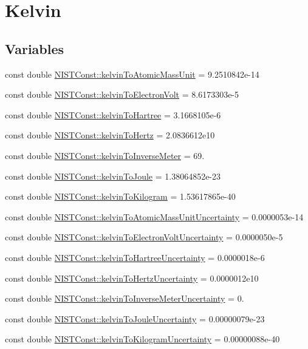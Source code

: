 \hypertarget{group___kelvin}{}\section{Kelvin}
\label{group___kelvin}
\subsection*{Variables}
\begin{DoxyCompactItemize}
\item 
const double \hyperlink{group___kelvin_gadad57a8f65f4d323846c97fbe0c485b1}{N\+I\+S\+T\+Const\+::kelvin\+To\+Atomic\+Mass\+Unit} = 9.\+2510842e-\/14
\item 
const double \hyperlink{group___kelvin_gae61d97fa154d94e710c951a26bd47896}{N\+I\+S\+T\+Const\+::kelvin\+To\+Electron\+Volt} = 8.\+6173303e-\/5
\item 
const double \hyperlink{group___kelvin_gaece5622592a7f817204ca28c6d00d570}{N\+I\+S\+T\+Const\+::kelvin\+To\+Hartree} = 3.\+1668105e-\/6
\item 
const double \hyperlink{group___kelvin_gaa426666c20c9b04efcdcfd05f5a90cd9}{N\+I\+S\+T\+Const\+::kelvin\+To\+Hertz} = 2.\+0836612e10
\item 
const double \hyperlink{group___kelvin_ga361938b994609879a0377a94e49dacf2}{N\+I\+S\+T\+Const\+::kelvin\+To\+Inverse\+Meter} = 69.
\item 
const double \hyperlink{group___kelvin_gae77577280e3dd4a78d41af37076c8f8d}{N\+I\+S\+T\+Const\+::kelvin\+To\+Joule} = 1.\+38064852e-\/23
\item 
const double \hyperlink{group___kelvin_gaf5fcf341c9c92f8ede2f402989ae8de1}{N\+I\+S\+T\+Const\+::kelvin\+To\+Kilogram} = 1.\+53617865e-\/40
\item 
const double \hyperlink{group___kelvin_ga9a73cc5e600276756aa8054000db2a12}{N\+I\+S\+T\+Const\+::kelvin\+To\+Atomic\+Mass\+Unit\+Uncertainty} = 0.\+0000053e-\/14
\item 
const double \hyperlink{group___kelvin_ga8be70ad50a3b92d35eeb830295bda75f}{N\+I\+S\+T\+Const\+::kelvin\+To\+Electron\+Volt\+Uncertainty} = 0.\+0000050e-\/5
\item 
const double \hyperlink{group___kelvin_gaf7b957ae0a4cb30b7b1f3bd5b7e8b9dd}{N\+I\+S\+T\+Const\+::kelvin\+To\+Hartree\+Uncertainty} = 0.\+0000018e-\/6
\item 
const double \hyperlink{group___kelvin_gaab1ae20957d14cd50d787ad307a1a45d}{N\+I\+S\+T\+Const\+::kelvin\+To\+Hertz\+Uncertainty} = 0.\+0000012e10
\item 
const double \hyperlink{group___kelvin_ga8867224cfd317842c338873d002a4f94}{N\+I\+S\+T\+Const\+::kelvin\+To\+Inverse\+Meter\+Uncertainty} = 0.
\item 
const double \hyperlink{group___kelvin_ga53c28e7735a083676a91272677dd1e89}{N\+I\+S\+T\+Const\+::kelvin\+To\+Joule\+Uncertainty} = 0.\+00000079e-\/23
\item 
const double \hyperlink{group___kelvin_gaa6783c525ec480ef30ad433a44bb5f33}{N\+I\+S\+T\+Const\+::kelvin\+To\+Kilogram\+Uncertainty} = 0.\+00000088e-\/40
\end{DoxyCompactItemize}


